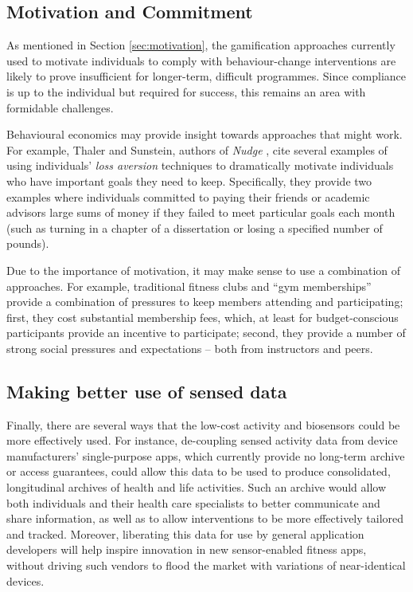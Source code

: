 \documentclass{www13-companion-accepted}
\begin{document}

\subsection{Motivation and Commitment}

As mentioned in Section \ref{sec:motivation}, the gamification
approaches currently used to motivate individuals to comply with
behaviour-change interventions are likely to prove insufficient for
longer-term, difficult programmes. Since compliance is up to the
individual but required for success, this remains an area with
formidable challenges.

Behavioural economics may provide insight towards approaches that
might work.  For example, Thaler and Sunstein, authors of \emph{Nudge}
\cite{thaler2008nudge}, cite several examples of using individuals' \emph{loss
  aversion} techniques to dramatically motivate individuals who have
important goals they need to keep.  Specifically, they provide two
examples where individuals committed to paying their friends or
academic advisors large sums of money if they failed to meet
particular goals each month (such as turning in a chapter of a
dissertation or losing a specified number of pounds).

Due to the importance of motivation, it may make sense to use a
combination of approaches.  For example, traditional fitness clubs and
``gym memberships'' provide a combination of pressures to keep members
attending and participating; first, they cost substantial membership
fees, which, at least for budget-conscious participants provide an
incentive to participate; second, they provide a number of strong
social pressures and expectations -- both from instructors and peers.

\subsection{Making better use of sensed data}

Finally, there are several ways that the low-cost activity and
biosensors could be more effectively used.  For instance, de-coupling
sensed activity data from device manufacturers' single-purpose apps,
which currently provide no long-term archive or access guarantees,
could allow this data to be used to produce consolidated, longitudinal
archives of health and life activities.  Such an archive would allow
both individuals and their health care specialists to better
communicate and share information, as well as to allow interventions
to be more effectively tailored and tracked.  Moreover, liberating
this data for use by general application developers will help inspire
innovation in new sensor-enabled fitness apps, without driving such
vendors to flood the market with variations of near-identical devices.
\end{document}
